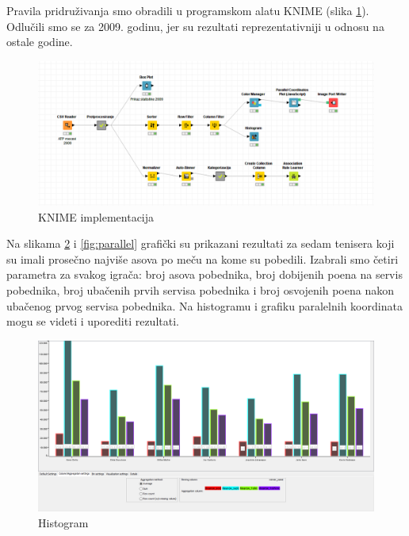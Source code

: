 \documentclass[a4paper]{article}
\begin{document}
Pravila pridruživanja smo obradili u programskom alatu KNIME (slika \ref{fig:knime}).
Odlučili smo se za 2009. godinu, jer su rezultati reprezentativniji u odnosu na ostale godine.

\begin{figure}[h!]
	\begin{center}
		\includegraphics[scale=0.37]{KNIME_project/PravilaPridruzivanja/knime.png}
	\end{center}
	\caption{KNIME implementacija}
	\label{fig:knime}
\end{figure}

Na slikama \ref{fig:histogram} i \ref{fig:parallel} grafički su prikazani rezultati za sedam
tenisera koji su imali prosečno najviše asova po meču na kome su pobedili. Izabrali smo četiri parametra za svakog igrača:
broj asova pobednika, broj dobijenih poena na servis pobednika, broj ubačenih prvih servisa pobednika i
broj osvojenih poena nakon ubačenog prvog servisa pobednika. Na histogramu i grafiku paralelnih koordinata 
mogu se videti i uporediti rezultati.

\begin{figure}[H]
	\begin{center}
		\includegraphics[scale=0.22]{KNIME_project/PravilaPridruzivanja/histogram2009}
	\end{center}
	\caption{Histogram}
	\label{fig:histogram}
\end{figure}
\end{document}
